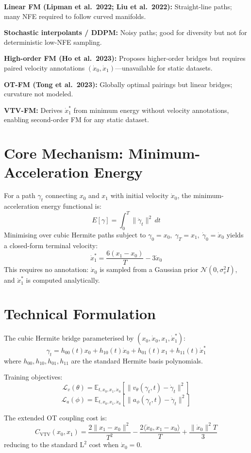 \documentclass[10pt,twocolumn]{article}
\begin{document}
\textbf{Linear FM (Lipman et al.\ 2022; Liu et al.\ 2022):} Straight-line paths;
many NFE required to follow curved manifolds.

\textbf{Stochastic interpolants / DDPM:} Noisy paths; good for diversity but
not for deterministic low-NFE sampling.

\textbf{High-order FM (Ho et al.\ 2023):} Proposes higher-order bridges but
requires paired velocity annotations $(\dot{x}_0, \dot{x}_1)$---unavailable for
static datasets.

\textbf{OT-FM (Tong et al.\ 2023):} Globally optimal pairings but linear bridges;
curvature not modeled.

\textbf{VTV-FM:} Derives $\dot{x}_1^*$ from minimum energy without velocity
annotations, enabling second-order FM for any static dataset.

\section{Core Mechanism: Minimum-Acceleration Energy}

For a path $\gamma_t$ connecting $x_0$ and $x_1$ with initial velocity $\dot{x}_0$,
the minimum-acceleration energy functional is:
\[
E[\gamma] = \int_0^T \|\ddot{\gamma}_t\|^2\,dt
\]
Minimising over cubic Hermite paths subject to
$\gamma_0 = x_0,\;\gamma_T = x_1,\;\dot{\gamma}_0 = \dot{x}_0$ yields a
closed-form terminal velocity:
\[
\dot{x}_1^* = \frac{6(x_1-x_0)}{T} - 3\dot{x}_0
\]
This requires no annotation: $\dot{x}_0$ is sampled from a Gaussian prior
$\mathcal{N}(0,\sigma_v^2 I)$, and $\dot{x}_1^*$ is computed analytically.

\section{Technical Formulation}

The cubic Hermite bridge parameterised by $(x_0, \dot{x}_0, x_1, \dot{x}_1^*)$:
\[
\gamma_t = h_{00}(t)x_0 + h_{10}(t)\dot{x}_0
         + h_{01}(t)x_1 + h_{11}(t)\dot{x}_1^*
\]
where $h_{00},h_{10},h_{01},h_{11}$ are the standard Hermite basis polynomials.

Training objectives:
\[
\mathcal{L}_v(\theta) = \mathbb{E}_{t,x_0,x_1,\dot{x}_0}
  \!\left[\|v_\theta(\gamma_t,t) - \dot{\gamma}_t\|^2\right]
\]
\[
\mathcal{L}_a(\phi) = \mathbb{E}_{t,x_0,x_1,\dot{x}_0}
  \!\left[\|a_\phi(\gamma_t,t) - \ddot{\gamma}_t\|^2\right]
\]

The extended OT coupling cost is:
\[
C_{\mathrm{VTV}}(x_0,x_1)
  = \frac{2\|x_1-x_0\|^2}{T^2}
  - \frac{2\langle\dot{x}_0, x_1-x_0\rangle}{T}
  + \frac{\|\dot{x}_0\|^2 T}{3}
\]
reducing to the standard $\mathrm{L}^2$ cost when $\dot{x}_0{=}0$.
\end{document}
